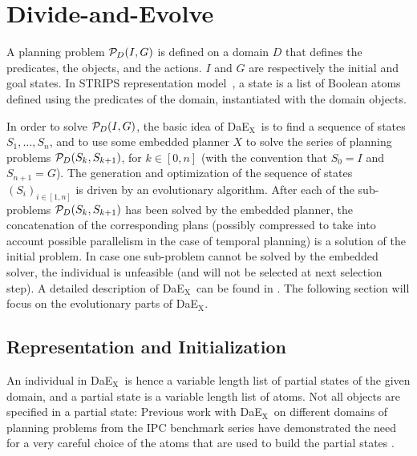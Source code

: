 \documentclass[a4paper,10pt]{article}
\def\DAEX{{\sc DaE$_{\text{X}}$}}
\begin{document}
\section{Divide-and-Evolve}
\label{sec:dae}
A planning problem ${\cal P}_D(I,G)$ is defined on a domain $D$ that defines the predicates, the objects, and the actions. $I$ and $G$ are respectively the initial and goal states. In STRIPS representation model~\cite{Fikes1971}, a state is a list of Boolean atoms defined using the predicates of the domain, instantiated with the domain objects.  

In order to solve  ${\cal P}_D(I,G)$, the basic idea of \DAEX\ is to find a sequence of states $S_1, \ldots, S_n$, and to use some embedded planner $X$ to solve the series of planning problems ${\cal P}_D(S_{k},S_{k+1})$, for $k \in [0,n]$ (with the convention that $S_0 = I$ and $S_{n+1} = G$).
The generation and optimization of the sequence of states $(S_i)_{i \in [1,n]}$  is driven by an evolutionary algorithm. After each of the sub-problems ${\cal P}_D(S_{k},S_{k+1})$ has been solved by the embedded planner, the concatenation of the corresponding plans (possibly compressed to take into account possible parallelism in the case of temporal planning) is a solution of the initial problem. In case one sub-problem cannot be solved by the embedded solver, the individual is unfeasible (and will not be selected at next selection step). A detailed description of \DAEX\ can be found in \cite{Bibai2010}. The following section will focus on the evolutionary parts of \DAEX.

\subsection{Representation and Initialization}
An individual in \DAEX\ is hence a  variable length list of partial states of the given domain, and a partial state is a variable length list of atoms. Not all objects are specified in a partial state:
Previous work with \DAEX\ on different domains of planning problems from the
IPC benchmark series have demonstrated the need for a very careful choice of the atoms that are used to build the partial states \cite{bibaiIPC6,bibai-EvoCOP2010}. 
\end{document}
